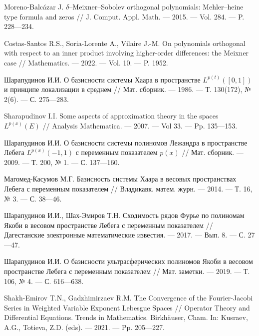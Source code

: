 \begin{thebibliography}{99}
{Moreno-Balc\'azar J.}
$\delta$--Meixner--Sobolev orthogonal polynomials: Mehler--heine type formula and zeros
//
J. Comput. Appl. Math.
--- 2015.
--- Vol. 284.
--- P. 228---234.




{Costas-Santos R.S., Soria-Lorente A., Vilaire J.-M.}
On polynomials orthogonal with respect to an inner product involving higher-order differences: the Meixner case
//
Mathematics.
--- 2022.
--- Vol. 10.
--- P. 1952.




Шарапудинов И.И.
О базисности системы Хаара в пространстве $L^{p(t)}([0,1])$ и принципе локализации в среднем
//
Мат. сборник.
--- 1986.
--- Т. 130(172), № 2(6).
--- С. 275---283.




Sharapudinov I.I. Some aspects of approximation theory in the spaces $L^{p(x)}(E)$
//
Analysis Mathematica.
--- 2007.
--- Vol 33.
--- Pp. 135---153.




Шарапудинов И.И. О базисности системы полиномов Лежандра в пространстве Лебега $L^{p(x)}(-1,1)$ с переменным показателем $p(x)$
//
Мат. сборник.
--- 2009.
--- Т. 200, № 1.
--- С. 137---160.




Магомед-Касумов М.Г.
Базисность системы Хаара в весовых пространствах Лебега с переменным показателем
//
Владикавк. матем. журн.
--- 2014.
--- Т. 16, № 3.
--- С. 38---46.




Шарапудинов И.И., Шах-Эмиров Т.Н.
Сходимость рядов Фурье по полиномам Якоби в весовом пространстве Лебега с переменным показателем
//
Дагестанские электронные математические известия.
--- 2017.
--- Вып. 8.
--- С. 27---47.




Шарапудинов И.И.
О базисности ультрасферических полиномов Якоби в весовом пространстве Лебега с переменным показателем
//
Мат. заметки.
--- 2019.
--- Т. 106, № 4.
--- С. 616---638.




Shakh-Emirov T.N., Gadzhimirzaev R.M.
The Convergence of the Fourier-Jacobi Series in Weighted Variable Exponent Lebesgue Spaces
//
Operator Theory and Differential Equations. Trends in Mathematics. Birkhäuser, Cham.  In: Kusraev, A.G., Totieva, Z.D. (eds).
--- 2021.
--- Pp. 205---227.





\end{thebibliography}
